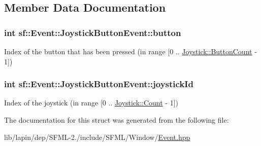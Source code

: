 \subsection{Member Data Documentation}
\hypertarget{structsf_1_1_event_1_1_joystick_button_event_a6412e698a2f7904c5aa875a0d1b34da4}{
\subsubsection[{button}]{ {\bf int} sf\-::\-Event\-::\-Joystick\-Button\-Event\-::button}}\label{structsf_1_1_event_1_1_joystick_button_event_a6412e698a2f7904c5aa875a0d1b34da4}


Index of the button that has been pressed (in range \mbox{[}0 .. \hyperlink{classsf_1_1_joystick_aa49548ab614125923944b5d340f67a77a34b2a9c61551a32ea6f60004963c7252}{Joystick\-::\-Button\-Count} -\/ 1\mbox{]}) 

\hypertarget{structsf_1_1_event_1_1_joystick_button_event_a2f80ecdb964a5ae0fc30726a404c41ec}{
\subsubsection[{joystick\-Id}]{ {\bf int} sf\-::\-Event\-::\-Joystick\-Button\-Event\-::joystick\-Id}}\label{structsf_1_1_event_1_1_joystick_button_event_a2f80ecdb964a5ae0fc30726a404c41ec}


Index of the joystick (in range \mbox{[}0 .. \hyperlink{classsf_1_1_joystick_aa49548ab614125923944b5d340f67a77a58bb2e8f3749310d61097e4361bc0ba8}{Joystick\-::\-Count} -\/ 1\mbox{]}) 



The documentation for this struct was generated from the following file\-:\begin{DoxyCompactItemize}
\item 
lib/lapin/dep/\-S\-F\-M\-L-\/2./include/\-S\-F\-M\-L/\-Window/\hyperlink{lib_2lapin_2dep_2_s_f_m_l-2_83_2include_2_s_f_m_l_2_window_2_event_8hpp}{Event.\-hpp}\end{DoxyCompactItemize}
